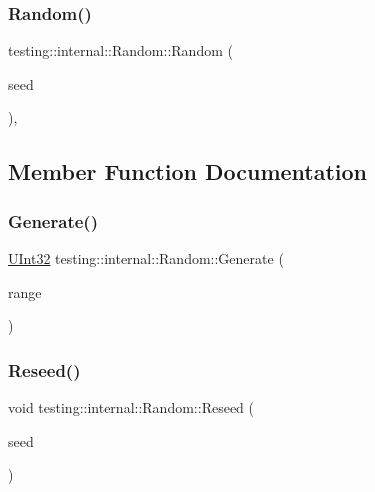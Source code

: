 \subsubsection{\texorpdfstring{Random()}{Random()}}
{\footnotesize\ttfamily testing\+::internal\+::\+Random\+::\+Random (\begin{DoxyParamCaption}\item[{\mbox{\hyperlink{namespacetesting_1_1internal_a40d4fffcd2bf56f18b1c380615aa85e3}{U\+Int32}}}]{seed }\end{DoxyParamCaption})\hspace{0.3cm}{\ttfamily [inline]}, {\ttfamily [explicit]}}



\subsection{Member Function Documentation}
\mbox{\label{classtesting_1_1internal_1_1Random_a9315b7fb621cbcfdf92ed4b5e584c0db}} 
\subsubsection{\texorpdfstring{Generate()}{Generate()}}
{\footnotesize\ttfamily \mbox{\hyperlink{namespacetesting_1_1internal_a40d4fffcd2bf56f18b1c380615aa85e3}{U\+Int32}} testing\+::internal\+::\+Random\+::\+Generate (\begin{DoxyParamCaption}\item[{\mbox{\hyperlink{namespacetesting_1_1internal_a40d4fffcd2bf56f18b1c380615aa85e3}{U\+Int32}}}]{range }\end{DoxyParamCaption})}

\mbox{\label{classtesting_1_1internal_1_1Random_adf2f24199318a46f885c78f50d89a69e}} 
\subsubsection{\texorpdfstring{Reseed()}{Reseed()}}
{\footnotesize\ttfamily void testing\+::internal\+::\+Random\+::\+Reseed (\begin{DoxyParamCaption}\item[{\mbox{\hyperlink{namespacetesting_1_1internal_a40d4fffcd2bf56f18b1c380615aa85e3}{U\+Int32}}}]{seed }\end{DoxyParamCaption})\hspace{0.3cm}{\ttfamily [inline]}}



